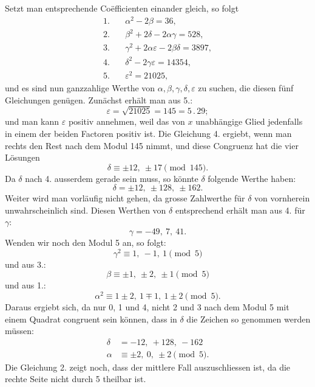 Setzt man entsprechende Coëfficienten einander gleich, so
folgt
\[
\begin{aligned}
1.&\quad \alpha^2 - 2\beta = 36,\\
2.&\quad \beta^2 + 2\delta - 2\alpha\gamma = 528,\\
3.&\quad \gamma^2 + 2\alpha\varepsilon - 2\beta\delta = 3897,\\
4.&\quad \delta^2 - 2\gamma\varepsilon = 14354,\\
5.&\quad \varepsilon^2 = 21025,
\end{aligned}
\]
und es sind nun ganzzahlige Werthe von $\alpha, \beta, \gamma, \delta, \varepsilon$ zu suchen,
die diesen fünf Gleichungen genügen. Zunächst erhält man aus 5.:
\[
\varepsilon = \sqrt{21025} = 145 = 5\,.\,29;
\]
und man kann $\varepsilon$ positiv annehmen, weil das von $x$ unabhängige
Glied jedenfalls in einem der beiden Factoren positiv ist. Die
Gleichung 4. ergiebt, wenn man rechts den Rest nach dem Modul
145 nimmt,
und diese Congruenz hat die vier Lösungen
\[
\delta \equiv \pm 12,\ \pm 17 \pmod{145}.
\]
Da $\delta$ nach 4. ausserdem gerade sein muss, so könnte $\delta$ folgende
Werthe haben:
\[
\delta = \pm 12,\ \pm 128,\ \pm 162.
\]
Weiter wird man vorläufig nicht gehen, da grosse Zahlwerthe für
$\delta$ von vornherein unwahrscheinlich sind. Diesen Werthen von $\delta$
entsprechend erhält man aus 4. für $\gamma$:
\[
\gamma = -49,\ 7,\ 41.
\]
Wenden wir noch den Modul 5 an, so folgt:
\[
\gamma^2 \equiv 1,\ -1,\ 1 \pmod{5}
\]
und aus 3.:
\[
\beta \equiv \pm 1,\ \pm 2,\ \pm 1 \pmod{5}
\]
und aus 1.:
\[
\alpha^2 \equiv 1 \pm 2,\ 1 \mp 1,\ 1 \pm 2 \pmod{5}.
\]
Daraus ergiebt sich, da nur 0, 1 und 4, nicht 2 und 3 nach
dem Modul 5 mit einem Quadrat congruent sein können, dass
in $\delta$ die Zeichen so genommen werden müssen:
\[
\begin{aligned}
\delta &= -12,\ +128,\ -162\\
\alpha &\equiv \pm 2,\ 0,\ \pm 2 \pmod{5}.
\end{aligned}
\]
Die Gleichung 2. zeigt noch, dass der mittlere Fall auszuschliessen ist, da die rechte Seite nicht durch 5 theilbar ist.
